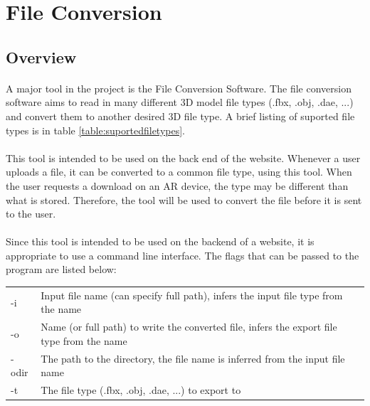  \section{File Conversion}

    \subsection{Overview}
    \paragraph{}
    A major tool in the project is the File Conversion Software.  
    The file conversion software aims to read in many different 3D model file types (.fbx, .obj, .dae, ...) and convert them to another desired 3D file type.  
    A brief listing of suported file types is in table \ref{table:suportedfiletypes}.

    \paragraph{}
    This tool is intended to be used on the back end of the website.  Whenever a user uploads a file, it can be converted to a common file type, using this tool.
    When the user requests a download on an AR device, the type may be different than what is stored.  Therefore, the tool will be used to convert the file before
    it is sent to the user.

    \paragraph{}
    Since this tool is intended to be used on the backend of a website, it is appropriate to use a command line interface.  
    The flags that can be passed to the program are listed below:

    \begin{table}[h]
        \centering
        \begin{tabular}{l  l}
            -i & Input file name (can specify full path), infers the input file type from the name \\
            -o & Name (or full path) to write the converted file, infers the export file type from the name \\
            -odir & The path to the directory, the file name is inferred from the input file name \\
            -t & The file type (.fbx, .obj, .dae, ...) to export to
        \end{tabular}
    \end{table}

